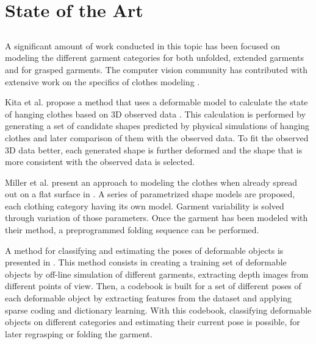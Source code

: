 \chapter{State of the Art}
\label{state_of_the_art}

\section{}
\section{}
\section{}


A significant amount of work conducted in this topic has been focused on modeling the different garment categories for both unfolded, extended garments and for grasped garments. The computer vision community has contributed with extensive work on the specifics of clothes modeling \cite{Chen2009}. 

Kita et al. propose a method that uses a deformable model to calculate the state of hanging clothes based on 3D observed data \cite{Kita2004, Kita2009}. This calculation is performed by generating a set of candidate shapes predicted by physical simulations of hanging clothes and later comparison of them with the observed data. To fit the observed 3D data better, each generated shape is further deformed and the shape that is more consistent with the observed data is selected. 

Miller et al. present an approach to modeling the clothes when already spread out on a flat surface in \cite{Miller2011}. A series of parametrized shape models are proposed, each clothing category having its own model. Garment variability is solved through variation of those parameters. Once the garment has been modeled with their method, a preprogrammed folding sequence can be performed.

A method for classifying and estimating the poses of deformable objects is presented in \cite{Li2014ICRA}. This method consists in creating a training set of deformable objects by off-line simulation of different garments, extracting depth images from different points of view. Then, a codebook is built for a set of different poses of each deformable object by extracting features from the dataset and applying sparse coding and dictionary learning. With this codebook, classifying deformable objects on different categories and estimating their current pose is possible, for later regrasping or folding the garment.

